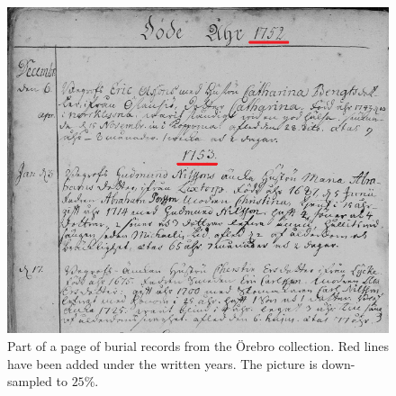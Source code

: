 
\begin{figure}
    \centering
    \includegraphics[scale=0.5]{resources/orebro_page.png}
    \caption{Part of a page of burial records from the {\"O}rebro collection. Red lines have been added under the written years. The picture is down-sampled to $25\%$.}
    \label{fig:page}
\end{figure}